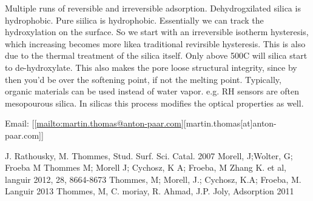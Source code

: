 \documentclass[12pt,a4paper,oneside,headinclude]{scrartcl}
\numberwithin{figure}{section}
\numberwithin{equation}{section}
\numberwithin{table}{section}
\begin{document}
Multiple runs of reversible and irreversible adsorption.
Dehydrogxilated silica is hydrophobic. Pure siilica is hydrophobic.
Essentially we can track the hydroxylation on the surface. So we start with an
irreversible isotherm hysteresis, which increasing becomes more likea
traditional revirsible hysteresis. This is also due to the thermal treatment of
the silica itself. Only above 500C will silica start to de-hydroxylate. This
also makes the pore loose structural integrity, since by then you'd be over the
softening point, if not the melting point. Typically, organic materials can be
used instead of water vapor. e.g. RH sensors are often mesopourous silica. In
silicas this process modifies the optical properties as well.

Email: [[\url{mailto:martin.thomas@anton-paar.com}][martin.thomas[at]anton-paar.com]]


J. Rathousky, M. Thommes, Stud. Surf. Sci. Catal. 2007
Morell, J;Wolter, G; Froeba M
Thommes M; Morell J; Cychosz, K A; Froeba, M
Zhang K. et al, languir 2012, 28, 8664-8673
Thommes, M; Morell, J.; Cychosz, K.A; Froeba, M. Languir 2013
Thommes, M, C. moriay, R. Ahmad, J.P. Joly, Adsorption 2011
\end{document}

